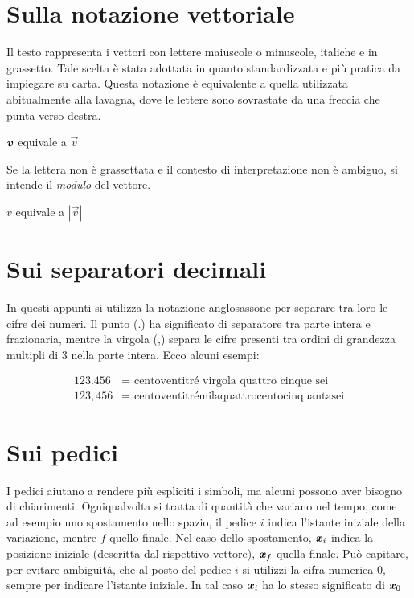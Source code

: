 
\section{Sulla notazione vettoriale}
Il testo rappresenta i vettori con lettere maiuscole o minuscole,
italiche e in grassetto. Tale scelta è stata adottata in quanto
standardizzata e più pratica da impiegare su carta. Questa notazione
è equivalente a quella utilizzata abitualmente alla lavagna, dove
le lettere sono sovrastate da una freccia che punta verso destra.

\begin{center}
    $\textbf{\textit{v}}$ equivale a $\vec{v}$
\end{center}

\noindent Se la lettera non è grassettata e il contesto di interpretazione
non è ambiguo, si intende il \textit{modulo} del vettore.

\begin{center}
    $v$ equivale a $|\vec{v}|$
\end{center}


\section{Sui separatori decimali}
In questi appunti si utilizza la notazione anglosassone per separare tra
loro le cifre dei numeri. Il punto (.) ha significato di separatore tra
parte intera e frazionaria, mentre la virgola (,) separa le cifre presenti
tra ordini di grandezza multipli di 3 nella parte intera. Ecco alcuni
esempi:

\begin{align*}
    123.456 &= \text{ centoventitré virgola quattro cinque sei}\\
    123,456 &= \text{ centoventitrémilaquattrocentocinquantasei}
\end{align*}

\section{Sui pedici}
I pedici aiutano a rendere più espliciti i simboli, ma alcuni possono
aver bisogno di chiarimenti. Ogniqualvolta si tratta di quantità che
variano nel tempo, come ad esempio uno spostamento nello spazio, il
pedice $i$ indica l'istante iniziale della variazione, mentre $f$
quello finale. Nel caso dello spostamento, $\textbf{\textit{x}}_i$ indica la
posizione iniziale (descritta dal rispettivo vettore), $\textbf{\textit{x}}_f$
quella finale. Può capitare, per evitare ambiguità, che al posto del
pedice $i$ si utilizzi la cifra numerica 0, sempre per indicare
l'istante iniziale. In tal caso $\textbf{\textit{x}}_i$ ha lo stesso significato
di $\textbf{\textit{x}}_0$

